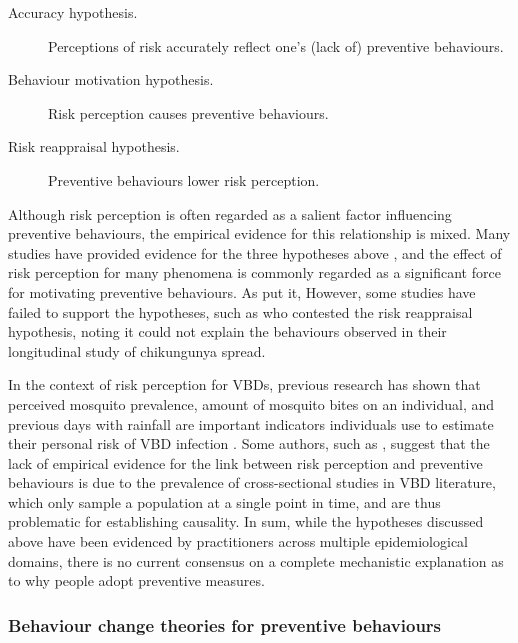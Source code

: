 \begin{description}
\item[Accuracy hypothesis.] Perceptions of risk accurately reflect one's (lack of) preventive behaviours.
\item[Behaviour motivation hypothesis.] Risk perception causes preventive behaviours.
\item[Risk reappraisal hypothesis.] Preventive behaviours lower risk perception.
\end{description}



Although risk perception is often regarded as a salient factor influencing preventive behaviours, the empirical evidence for this relationship is mixed. Many studies have provided evidence for the three hypotheses above \cite{brewer_risk_2004, lopes-rafegas_contribution_2023, aerts_understanding_2020, qin_exploring_2021}, and the effect of risk perception for many phenomena is commonly regarded as a significant force for motivating preventive behaviours. As \citet{tan_severe_2004} put it,  However, some studies have failed to support the hypotheses, such as \citet{raude_understanding_2019} who contested the risk reappraisal hypothesis, noting it could not explain the behaviours observed in their longitudinal study of chikungunya spread.

In the context of risk perception for VBDs, previous research has shown that perceived mosquito prevalence, amount of mosquito bites on an individual, and previous days with rainfall are important indicators individuals use to estimate their personal risk of VBD infection \cite{raude_public_2012, lopes-rafegas_contribution_2023, constant_ecology_2020}. Some authors, such as \citet{qin_exploring_2021}, suggest that the lack of empirical evidence for the link between risk perception and preventive behaviours is due to the prevalence of cross-sectional studies in VBD literature, which only sample a population at a single point in time, and are thus problematic for establishing causality. In sum, while the hypotheses discussed above have been evidenced by practitioners across multiple epidemiological domains, there is no current consensus on a complete mechanistic explanation as to why people adopt preventive measures.

\subsubsection{Behaviour change theories for preventive behaviours}\label{sec:lit-review-bcts}

